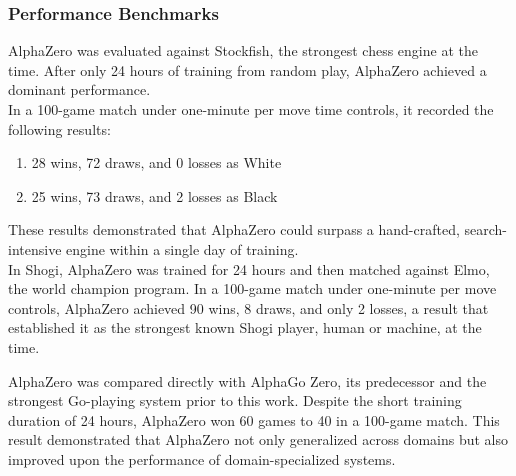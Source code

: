 \subsubsection{Performance Benchmarks}

AlphaZero was evaluated against Stockfish, the strongest chess engine at the time. After only 24 hours of training from random play, AlphaZero achieved a dominant performance. \\
In a 100-game match under one-minute per move time controls, it recorded the following results: \\
\begin{enumerate}
    \item 28 wins, 72 draws, and 0 losses as White
    \item 25 wins, 73 draws, and 2 losses as Black
\end{enumerate}
These results demonstrated that AlphaZero could surpass a hand-crafted, search-intensive engine within a single day of training. \\

In Shogi, AlphaZero was trained for 24 hours and then matched against Elmo, the world champion program. In a 100-game match under one-minute per move controls, AlphaZero achieved 90 wins, 8 draws, and only 2 losses, a result that established it as the strongest known Shogi player, human or machine, at the time. \\


AlphaZero was compared directly with AlphaGo Zero, its predecessor and the strongest Go-playing system prior to this work. Despite the short training duration of 24 hours, AlphaZero won 60 games to 40 in a 100-game match. This result demonstrated that AlphaZero not only generalized across domains but also improved upon the performance of domain-specialized systems.



